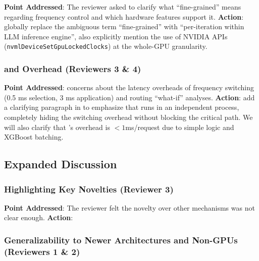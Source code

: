 \textbf{Point Addressed}: The reviewer asked to clarify what ``fine-grained'' means regarding frequency control and which hardware features support it.
\textbf{Action}: globally replace the ambiguous term ``fine-grained'' with ``per-iteration within LLM inference engine'', also explicitly mention the use of NVIDIA APIs (\texttt{nvmlDeviceSetGpuLockedClocks}) at the whole-GPU granularity. 

\subsubsection{\governor and \router Overhead (Reviewers 3 \& 4)}

\textbf{Point Addressed}: concerns about the latency overheads of frequency switching (0.5 ms selection, 3 ms application) and routing ``what-if'' analyses.
\textbf{Action}: add a clarifying paragraph in  to emphasize that \gpvernor runs in an independent process, completely hiding the switching overhead without blocking the critical path. We will also clarify that \router's overhead is $<1$ms/request due to simple logic and XGBoost batching.

\subsection{Expanded Discussion}


\subsubsection{Highlighting Key Novelties (Reviewer 3)}

\textbf{Point Addressed}: The reviewer felt the novelty over other mechanisms was not clear enough.
\textbf{Action}: 
 

\subsubsection{Generalizability to Newer Architectures and Non-GPUs (Reviewers 1 \& 2)}


